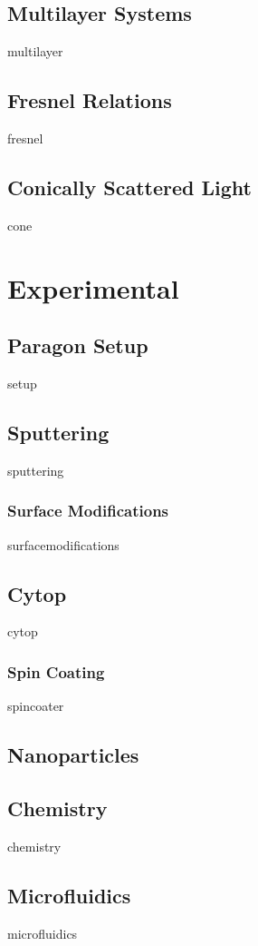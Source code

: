 \documentclass[a4paper,titlepage,onecolumn]{report}
\begin{document}
 \section{Multilayer Systems}
 {multilayer}
 \section{Fresnel Relations}
 {fresnel}
 \section{Conically Scattered Light}
 {cone}

\chapter{Experimental} \label{ch:experimental}
 \section{Paragon Setup}
 {setup}
 \section{Sputtering}
 {sputtering}
  \subsection{Surface Modifications}
  {surfacemodifications}
 \section{Cytop}
 {cytop}
  \subsection{Spin Coating}
  {spincoater}
 \section{Nanoparticles}
 \section{Chemistry}
 {chemistry}
 \section{Microfluidics}
 {microfluidics}
\end{document}
